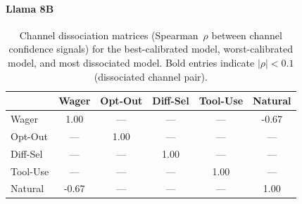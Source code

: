 \begin{table}[ht]
\centering
\caption{Channel dissociation matrices (Spearman~$\rho$ between channel confidence
  signals) for the best-calibrated model, worst-calibrated model, and most
  dissociated model. Bold entries indicate $|\rho| < 0.1$ (dissociated channel
  pair).}
\label{tab:dissociation}

\paragraph{Llama 8B}
\begin{tabular}{lccccc}
\toprule
 & Wager & Opt-Out & Diff-Sel & Tool-Use & Natural \\
\midrule
        Wager & 1.00 & — & — & — & -0.67 \\
        Opt-Out & — & 1.00 & — & — & — \\
        Diff-Sel & — & — & 1.00 & — & — \\
        Tool-Use & — & — & — & 1.00 & — \\
        Natural & -0.67 & — & — & — & 1.00 \\
\bottomrule
\end{tabular}
\end{table}
